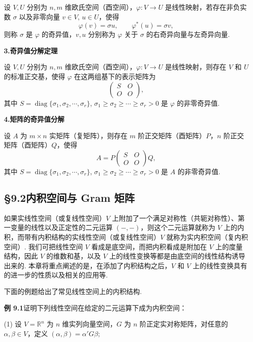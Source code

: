 \documentclass[UTF8,12pt,a4paper,fontset=fandol]{ctexart}
\begin{document}
设 $V,U$ 分别为 $n,m$ 维欧氏空间（酉空间），$\varphi:V\to U$ 是线性映射，若存在非负实数 $\sigma$ 以及非零向量 $v\in V$, $u\in U$，使得
\[
\varphi(v)=\sigma u,\qquad \varphi^*(u)=\sigma v,
\]
则称 $\sigma$ 是 $\varphi$ 的奇异值，$v,u$ 分别称为 $\varphi$ 关于 $\sigma$ 的右奇异向量与左奇异向量.

\noindent\textbf{3.\quad 奇异值分解定理}

设 $V,U$ 分别为 $n,m$ 维欧氏空间（酉空间），$\varphi:V\to U$ 是线性映射，则存在 $V$ 和 $U$ 的标准正交基，使得 $\varphi$ 在这两组基下的表示矩阵为
\[
\begin{pmatrix}
S & O\\
O & O
\end{pmatrix},
\]
其中 $S=\operatorname{diag}\{\sigma_1,\sigma_2,\cdots,\sigma_r\}$, $\sigma_1\ge \sigma_2\ge \cdots\ge \sigma_r>0$ 是 $\varphi$ 的非零奇异值.

\noindent\textbf{4.\quad 矩阵的奇异值分解}

设 $A$ 为 $m\times n$ 实矩阵（复矩阵），则存在 $m$ 阶正交矩阵（酉矩阵）$P$，$n$ 阶正交矩阵（酉矩阵）$Q$，使得
\[
A=P
\begin{pmatrix}
S & O\\
O & O
\end{pmatrix}
Q,
\]
其中 $S=\operatorname{diag}\{\sigma_1,\sigma_2,\cdots,\sigma_r\}$, $\sigma_1\ge \sigma_2\ge \cdots\ge \sigma_r>0$ 是 $A$ 的非零奇异值.

\subsection*{§9.2\quad 内积空间与 Gram 矩阵}

如果实线性空间（或复线性空间）$V$ 上附加了一个满足对称性（共轭对称性）、第一变量的线性以及正定性的二元运算 $(-,-)$，则这个二元运算就称为 $V$ 上的内积，而带有内积结构的实线性空间（或复线性空间）$V$ 就称为实内积空间（复内积空间）. 我们可把线性空间 $V$ 看成是底空间，而把内积看成是附加在 $V$ 上的度量结构，因此 $V$ 的维数和基，以及 $V$ 上的线性变换等都是由底空间的线性结构诱导出来的. 本章将重点阐述的是，在添加了内积结构之后，$V$ 和 $V$ 上的线性变换具有的进一步的性质以及相关的应用等.

下面的例题给出了常见线性空间上的内积结构.

\noindent\textbf{例 9.1}\quad 证明下列线性空间在给定的二元运算下成为内积空间：

(1) 设 $V=\mathbb{R}^n$ 为 $n$ 维实列向量空间，$G$ 为 $n$ 阶正定实对称矩阵，对任意的 $\alpha,\beta\in V$，定义 $(\alpha,\beta)=\alpha'G\beta$;
\end{document}

